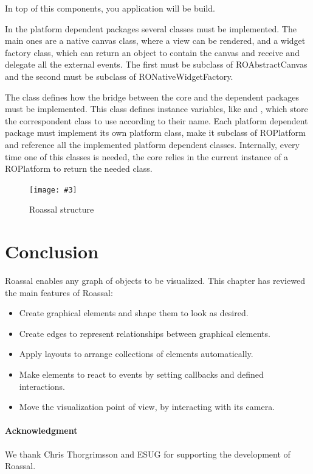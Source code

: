 \documentclass[a4paper,10pt,twoside]{book}
\newcommand{\fig}[4]{
		\begin{figure}[#1]
			\centering
			\texttt{[image: \#3]}
			\caption{\label{fig:#3}#4}
		\end{figure}}
\begin{document}
In top of this components, you application will be build.

In the platform dependent packages several classes must be implemented. The main ones are a native canvas class, where a view can be rendered, and a widget factory class, which can return an object to contain the canvas and receive and delegate all the external events.
The first must be subclass of ROAbstractCanvas and the second must be subclass of RONativeWidgetFactory.

The  class defines how the bridge between the core and the dependent packages must be implemented. This class defines instance variables, like  and , which store the correspondent class to use according to their name. Each platform dependent package must implement its own platform class, make it subclass of ROPlatform and reference all the implemented platform dependent classes.
Internally, every time one of this classes is needed, the core relies in the current instance of a ROPlatform to return the needed class.

\fig{H}{0.3}{structure}{Roassal structure}



\section{Conclusion}

Roassal enables any graph of objects to be visualized. This chapter has reviewed the main features of Roassal:

\begin{itemize}
\item Create graphical elements and shape them to look as desired.
\item Create edges to represent relationships between graphical elements.
\item Apply layouts to arrange collections of elements automatically.
\item Make elements to react to events by setting callbacks and defined interactions.
\item Move the visualization point of view, by interacting with its camera.
\end{itemize}

\paragraph{Acknowledgment}
We thank Chris Thorgrimsson and ESUG for supporting the development of Roassal.
\end{document}
